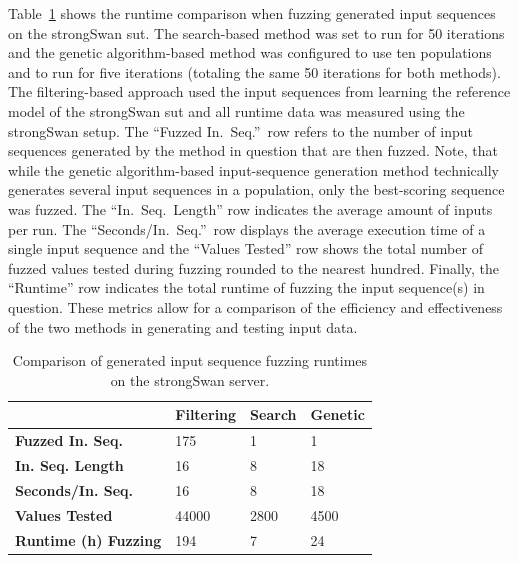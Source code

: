 Table~\ref{tab:compfuzz} shows the runtime comparison when fuzzing generated input sequences on the strongSwan \ac{sut}. The search-based method was set to run for 50 iterations and the genetic algorithm-based method was configured to use ten populations and to run for five iterations (totaling the same 50 iterations for both methods). The filtering-based approach used the input sequences from learning the reference model of the strongSwan \ac{sut} and all runtime data was measured using the strongSwan setup. The ``Fuzzed In.~Seq.''~row refers to the number of input sequences generated by the method in question that are then fuzzed. Note, that while the genetic algorithm-based input-sequence generation method technically generates several input sequences in a population, only the best-scoring sequence was fuzzed. The ``In.~Seq.~Length'' row indicates the average amount of inputs per run. The ``Seconds/In.~Seq.''~row displays the average execution time of a single input sequence and the ``Values Tested'' row shows the total number of fuzzed values tested during fuzzing rounded to the nearest hundred. Finally, the ``Runtime'' row indicates the total runtime of fuzzing the input sequence(s) in question. These metrics allow for a comparison of the efficiency and effectiveness of the two methods in generating and testing input data.


\begin{table}[h]
	\centering
	\begin{tabular}{|l|l|l|l|}
		\hline
		\rowcolor[HTML]{EFEFEF} 
		& \textbf{Filtering}					& \textbf{Search} 			& \textbf{Genetic}  \\ \hline
		\textbf{Fuzzed In. Seq.}            	& 175                 					& 1                			& 1					\\ \hline
		\textbf{In. Seq. Length}				& 16                					& 8               			& 18		  		\\ \hline
		\textbf{Seconds/In. Seq.}     			& 16                					& 8                			& 18				\\ \hline
		\textbf{Values Tested}     				& 44000              					& 2800		    			& 4500				\\ \hline
		\textbf{Runtime (h) Fuzzing}       		& 194          	 						& 7          				& 24				\\ \hline
	\end{tabular}
	\caption{Comparison of generated input sequence fuzzing runtimes on the strongSwan server.}
	\label{tab:compfuzz}
\end{table}

